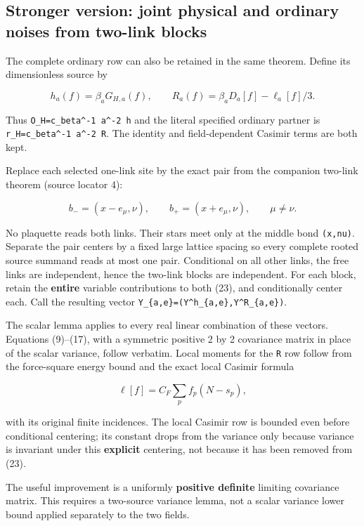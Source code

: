 \documentclass[
  11pt,
]{article}
\begin{document}
\hypertarget{stronger-version-joint-physical-and-ordinary-noises-from-two-link-blocks}{%
\subsection{Stronger version: joint physical and ordinary noises from
two-link
blocks}\label{stronger-version-joint-physical-and-ordinary-noises-from-two-link-blocks}}

The complete ordinary row can also be retained in the same theorem.
Define its dimensionless source by

\[
 h_a(f)=\beta_aG_{H,a}(f),\qquad
 R_a(f)=\beta_aD_a[f]-\ell_a[f]/3.
 \tag{23}
\]

Thus \texttt{O\_H=c\_beta\^{}-1\ a\^{}-2\ h} and the literal specified
ordinary partner is \texttt{r\_H=c\_beta\^{}-1\ a\^{}-2\ R}. The
identity and field-dependent Casimir terms are both kept.

Replace each selected one-link site by the exact pair from the companion
two-link theorem (source locator 4):

\[
 b_-=(x-e_\mu,\nu),\qquad b_+=(x+e_\mu,\nu),\qquad\mu\ne\nu.
\]

No plaquette reads both links. Their stars meet only at the middle bond
\texttt{(x,nu)}. Separate the pair centers by a fixed large lattice
spacing so every complete rooted source summand reads at most one pair.
Conditional on all other links, the free links are independent, hence
the two-link blocks are independent. For each block, retain the
\textbf{entire} variable contributions to both (23), and conditionally
center each. Call the resulting vector
\texttt{Y\_\{a,e\}=(Y\^{}h\_\{a,e\},Y\^{}R\_\{a,e\})}.

The scalar lemma applies to every real linear combination of these
vectors. Equations (9)--(17), with a symmetric positive 2 by 2
covariance matrix in place of the scalar variance, follow verbatim.
Local moments for the \texttt{R} row follow from the force-square energy
bound and the exact local Casimir formula

\[
 \ell[f]=C_F\sum_pf_p(N-s_p),
\]

with its original finite incidences. The local Casimir row is bounded
even before conditional centering; its constant drops from the variance
only because variance is invariant under this \textbf{explicit}
centering, not because it has been removed from (23).

The useful improvement is a uniformly \textbf{positive definite}
limiting covariance matrix. This requires a two-source variance lemma,
not a scalar variance lower bound applied separately to the two fields.
\end{document}

